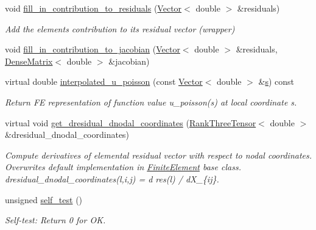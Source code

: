 \begin{DoxyCompactItemize}
\item 
void \hyperlink{classoomph_1_1PoissonEquations_a2b6578ce3ddd81293242becba40aaf3f}{fill\+\_\+in\+\_\+contribution\+\_\+to\+\_\+residuals} (\hyperlink{classoomph_1_1Vector}{Vector}$<$ double $>$ \&residuals)
\begin{DoxyCompactList}\small\item\em Add the element\textquotesingle{}s contribution to its residual vector (wrapper) \end{DoxyCompactList}\item 
void \hyperlink{classoomph_1_1PoissonEquations_ad5e268cfc535826603e868612f892c49}{fill\+\_\+in\+\_\+contribution\+\_\+to\+\_\+jacobian} (\hyperlink{classoomph_1_1Vector}{Vector}$<$ double $>$ \&residuals, \hyperlink{classoomph_1_1DenseMatrix}{Dense\+Matrix}$<$ double $>$ \&jacobian)
\item 
virtual double \hyperlink{classoomph_1_1PoissonEquations_a9f31492636bebfe62cdacaab4b529c69}{interpolated\+\_\+u\+\_\+poisson} (const \hyperlink{classoomph_1_1Vector}{Vector}$<$ double $>$ \&\hyperlink{cfortran_8h_ab7123126e4885ef647dd9c6e3807a21c}{s}) const
\begin{DoxyCompactList}\small\item\em Return FE representation of function value u\+\_\+poisson(s) at local coordinate s. \end{DoxyCompactList}\item 
virtual void \hyperlink{classoomph_1_1PoissonEquations_a566350ffaf9170d934ae02b0c3cb7064}{get\+\_\+dresidual\+\_\+dnodal\+\_\+coordinates} (\hyperlink{classoomph_1_1RankThreeTensor}{Rank\+Three\+Tensor}$<$ double $>$ \&dresidual\+\_\+dnodal\+\_\+coordinates)
\begin{DoxyCompactList}\small\item\em Compute derivatives of elemental residual vector with respect to nodal coordinates. Overwrites default implementation in \hyperlink{classoomph_1_1FiniteElement}{Finite\+Element} base class. dresidual\+\_\+dnodal\+\_\+coordinates(l,i,j) = d res(l) / d\+X\+\_\+\{ij\}. \end{DoxyCompactList}\item 
unsigned \hyperlink{classoomph_1_1PoissonEquations_a04816974542e5764e1ec3f88d69b99ab}{self\+\_\+test} ()
\begin{DoxyCompactList}\small\item\em Self-\/test\+: Return 0 for OK. \end{DoxyCompactList}\end{DoxyCompactItemize}
